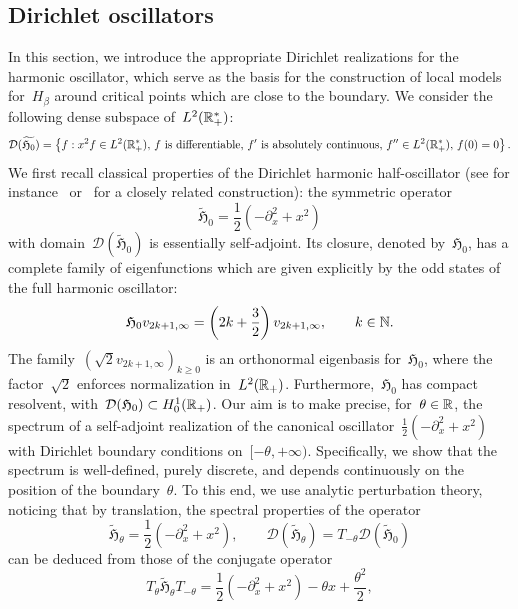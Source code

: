     \subsection{Dirichlet oscillators}\label{02:subsec:dirichlet_oscillators}
    In this section, we introduce the appropriate Dirichlet realizations for the harmonic oscillator, which serve as the basis for the construction of local models for~$H_\beta$ around critical points which are close to the boundary.
    We consider the following dense subspace of~$L^2(\mathbb{R}_+^*)$:
    \[\mathcal D(\widetilde{\mathfrak H_0}) = \left\{f:x^2 f\in L^2(\mathbb{R}_+^*),\,f\text{ is differentiable, }f'\text{ is absolutely continuous, }f''\in L^2(\mathbb{R}_+^*),\,f(0)=0\right\}.\]
    We first recall classical properties of the Dirichlet harmonic half-oscillator (see for instance~\cite[Chapter X.1]{RS75} or~\cite[Section 5.1.2]{BS12} for a closely related construction): the symmetric operator
   ~$$ \widetilde{\mathfrak H}_0 = \frac12(-\partial_x^2+x^2)$$
    with domain~$\mathcal D(\widetilde{\mathfrak H}_0)$ is essentially self-adjoint. Its closure, denoted by~$\mathfrak{H}_0$, has a complete family of eigenfunctions which are given explicitly by the odd states of the full harmonic oscillator:
    \begin{equation}
        \label{02:harmonic_half_oscillator}
        \mathfrak{H}_0 v_{2k+1,\infty} = \left(2k + \frac32\right) v_{2k+1,\infty},\qquad k\in \mathbb{N}.
    \end{equation}
    The family~$(\sqrt 2 v_{2k+1,\infty})_{k\geq 0}$ is an orthonormal eigenbasis for~$\mathfrak{H}_0$, where the factor~$\sqrt 2$ enforces normalization in~$L^2(\mathbb{R}_+)$. Furthermore,~$\mathfrak{H}_0$ has compact resolvent, with~$\mathcal D({\mathfrak{H}}_0) \subset H_0^1(\mathbb{R}_+)$.
    Our aim is to make precise, for~$\theta\in\mathbb{R}$, the spectrum of a self-adjoint realization of the canonical oscillator~$\frac12(-\partial_x^2+x^2)$ with Dirichlet boundary conditions on~$[-\theta,+\infty)$. Specifically, we show that the spectrum is well-defined, purely discrete, and depends continuously on the position of the boundary~$\theta$.
    To this end, we use analytic perturbation theory, noticing that by translation, the spectral properties of the operator
   ~$$\widetilde{\mathfrak H}_\theta = \frac12(-\partial_x^2+x^2),\qquad \mathcal D(\widetilde{\mathfrak H}_\theta) = T_{-\theta}\mathcal D(\widetilde{\mathfrak H}_0)$$
    can be deduced from those of the conjugate operator
   ~\begin{equation}
    \label{02:eq:perturbation_conjugate}
    T_{\theta} \widetilde{\mathfrak H}_\theta  T_{-\theta}=\frac12(-\partial_x^2+x^2) - \theta x +\frac{\theta^2}2,
   \end{equation}  
